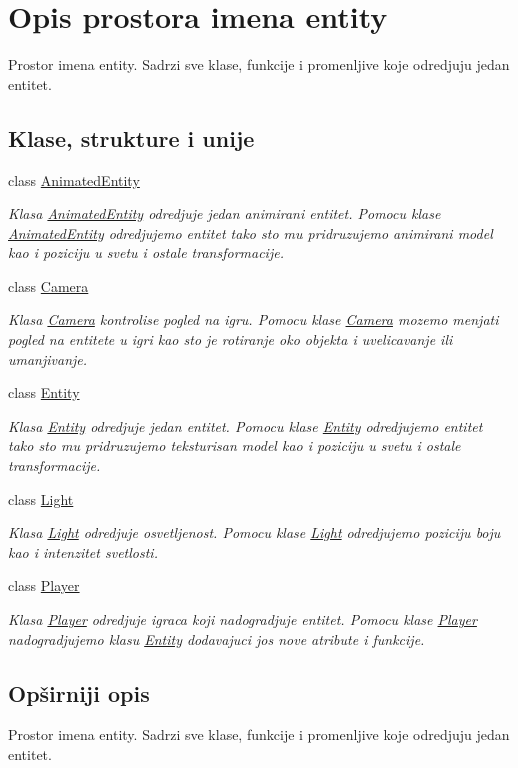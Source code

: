 \hypertarget{namespaceentity}{}\section{Opis prostora imena entity}
\label{namespaceentity}


Prostor imena entity. Sadrzi sve klase, funkcije i promenljive koje odredjuju jedan entitet.  


\subsection*{Klase, strukture i unije}
\begin{DoxyCompactItemize}
\item 
class \hyperlink{classentity_1_1AnimatedEntity}{Animated\+Entity}
\begin{DoxyCompactList}\small\item\em Klasa \hyperlink{classentity_1_1AnimatedEntity}{Animated\+Entity} odredjuje jedan animirani entitet. Pomocu klase \hyperlink{classentity_1_1AnimatedEntity}{Animated\+Entity} odredjujemo entitet tako sto mu pridruzujemo animirani model kao i poziciju u svetu i ostale transformacije. \end{DoxyCompactList}\item 
class \hyperlink{classentity_1_1Camera}{Camera}
\begin{DoxyCompactList}\small\item\em Klasa \hyperlink{classentity_1_1Camera}{Camera} kontrolise pogled na igru. Pomocu klase \hyperlink{classentity_1_1Camera}{Camera} mozemo menjati pogled na entitete u igri kao sto je rotiranje oko objekta i uvelicavanje ili umanjivanje. \end{DoxyCompactList}\item 
class \hyperlink{classentity_1_1Entity}{Entity}
\begin{DoxyCompactList}\small\item\em Klasa \hyperlink{classentity_1_1Entity}{Entity} odredjuje jedan entitet. Pomocu klase \hyperlink{classentity_1_1Entity}{Entity} odredjujemo entitet tako sto mu pridruzujemo teksturisan model kao i poziciju u svetu i ostale transformacije. \end{DoxyCompactList}\item 
class \hyperlink{classentity_1_1Light}{Light}
\begin{DoxyCompactList}\small\item\em Klasa \hyperlink{classentity_1_1Light}{Light} odredjuje osvetljenost. Pomocu klase \hyperlink{classentity_1_1Light}{Light} odredjujemo poziciju boju kao i intenzitet svetlosti. \end{DoxyCompactList}\item 
class \hyperlink{classentity_1_1Player}{Player}
\begin{DoxyCompactList}\small\item\em Klasa \hyperlink{classentity_1_1Player}{Player} odredjuje igraca koji nadogradjuje entitet. Pomocu klase \hyperlink{classentity_1_1Player}{Player} nadogradjujemo klasu \hyperlink{classentity_1_1Entity}{Entity} dodavajuci jos nove atribute i funkcije. \end{DoxyCompactList}\end{DoxyCompactItemize}


\subsection{Opširniji opis}
Prostor imena entity. Sadrzi sve klase, funkcije i promenljive koje odredjuju jedan entitet. 